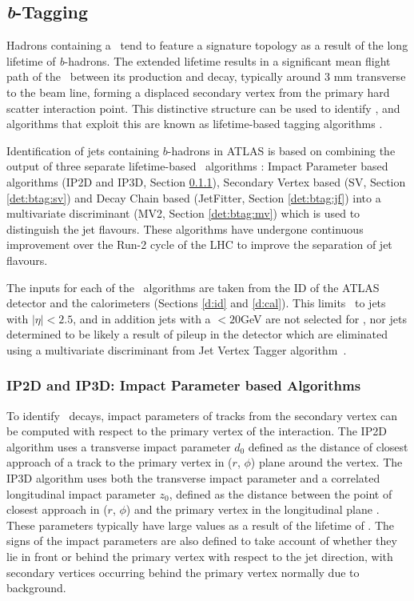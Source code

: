 \subsection{\textit{b}-Tagging}
\label{det:btagging}

	Hadrons containing a \bquark\, tend to feature a signature topology as a result of the long lifetime of \textit{b}-hadrons. The extended lifetime results in a significant mean flight path of the \bhadron\ between its production and decay, typically around 3 mm transverse to the beam line, forming a displaced secondary vertex from the primary hard scatter interaction point. This distinctive structure can be used to identify \bjets, and algorithms that exploit this are known as lifetime-based tagging algorithms \cite{bTagPerformance}.

	Identification of jets containing $b$-hadrons in ATLAS is based on combining the output of three separate lifetime-based \btag\, algorithms \cite{bTagExpPerf}: Impact Parameter based algorithms (IP2D and IP3D, Section \ref{det:btag:ip}), Secondary Vertex based (SV, Section \ref{det:btag:sv}) and Decay Chain based (JetFitter, Section \ref{det:btag:jf}) into a multivariate discriminant (MV2, Section \ref{det:btag:mv}) which is used to distinguish the jet flavours. These algorithms have undergone continuous improvement over the Run-2 cycle of the LHC to improve the separation of jet flavours.

	The inputs for each of the \btagging\, algorithms are taken from the ID of the ATLAS detector and the calorimeters (Sections \ref{d:id} and \ref{d:cal}). This limits \btagging\, to jets with $|\eta|<2.5$, and in addition jets with a \pt$<20$GeV are not selected for \btagging, nor jets determined to be likely a result of pileup in the detector which are eliminated using a multivariate discriminant from Jet Vertex Tagger algorithm~\cite{btagOptimisation, pileup}.

	\subsubsection{IP2D and IP3D: Impact Parameter based Algorithms}
		\label{det:btag:ip}

		To identify \bhadron\ decays, impact parameters of tracks from the secondary vertex can be computed with respect to the primary vertex of the interaction. The IP2D algorithm uses a transverse impact parameter $d_0$ defined as the distance of closest approach of a track to the  primary vertex in ($r$, $\phi$) plane around the vertex. The IP3D algorithm uses both the transverse impact parameter and a correlated longitudinal impact parameter $z_0$, defined as the distance between the point of closest approach in ($r$, $\phi$) and the primary vertex in the longitudinal plane \cite{IP3D}. These parameters typically have large values as a result of the lifetime of \bquark. The signs of the impact parameters are also defined to take account of whether they lie in front or behind the primary vertex with respect to the jet direction, with secondary vertices occurring behind the primary vertex normally due to background.

